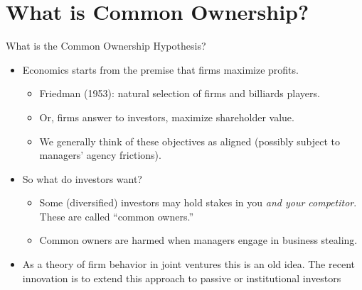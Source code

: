 


\section{What is Common Ownership?}

\begin{frame}[plain]{What is the Common Ownership Hypothesis?}
\begin{itemize}
\item Economics starts from the premise that firms maximize profits.
\begin{itemize}
\item Friedman (1953): natural selection of firms and billiards players.
\item Or, firms answer to investors, \alert{maximize shareholder value}.
\item We generally think of these objectives as aligned (possibly subject to managers' agency frictions).
\end{itemize}
\item So what do investors want?
\begin{itemize}
\item Some (diversified) investors may hold stakes in you \textit{and your competitor}. These are called ``common owners.''
\item Common owners are harmed when managers engage in \alert{business stealing}.
\end{itemize}
\item As a theory of firm behavior in \alert{joint ventures} this is an old idea. The recent innovation is to extend this approach to \alert{passive or institutional investors}
\end{itemize}
\end{frame}

